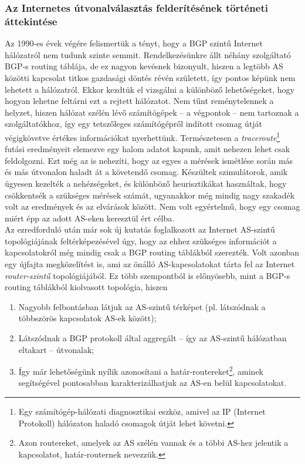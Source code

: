   \subsubsection{Az Internetes útvonalválasztás felderítésének történeti áttekintése}\label{section_tortenelem}
  Az 1990-es évek végére felismertük a tényt, hogy a BGP szintű Internet hálózatról nem tudunk szinte semmit. Rendelkezésünkre állt néhány szolgáltató BGP-s routing táblája, de ez nagyon kevésnek bizonyult, hiszen a legtöbb AS közötti kapcsolat titkos gazdasági döntés révén született, így pontos képünk nem lehetett a hálózatról. Ekkor kezdtük el vizsgálni a különböző lehetőségeket, hogy hogyan lehetne feltárni ezt a rejtett hálózatot. Nem tűnt reménytelennek a helyzet, hiszen hálózat szélén lévő számítógépek -- a végpontok -- nem tartoznak a szolgáltatókhoz, így egy tetszőleges számítógépről indított csomag útját végigkövetve értékes információkat nyerhettünk. Természetesen a \textit{traceroute}\footnote{Egy számítógép-hálózati diagnosztikai eszköz, amivel az IP (Internet Protokoll) hálózaton haladó csomagok útját lehet követni.} futási eredményeit elemezve egy halom adatot kapunk, amit nehezen lehet csak feldolgozni. Ezt még az is nehezíti, hogy az egyes a mérések ismétlése során más és más útvonalon haladt át a követendő csomag. Készültek szimulátorok, amik ügyesen kezelték a nehézségeket, és különböző heurisztikákat használtak, hogy csökkentsék a szükséges mérések számát\cite{Heuristics_for_Internet_Map_Discovery}, ugyanakkor még mindig nagy szakadék volt az eredmények és az elvárások között. Nem volt egyértelmű, hogy egy csomag miért épp az adott AS-eken keresztül ért célba.\\

  Az ezredforduló után már sok új kutatás foglalkozott az Internet AS-szintű topológiájának feltérképezésével úgy, hogy az ehhez szükséges információt a kapcsolatokról még mindig csak a BGP routing táblákból szerezték. Volt azonban egy újfajta megközelítést is, ami az önálló AS-kapcsolatokat tárta fel az Internet \textit{router-szintű} topológiájából\cite{Inferring_AS_level_Internet_Topology_from_Router_Level_Path_Traces}. Ez több szempontból is előnyösebb, mint a BGP-s routing táblákból kiolvasott topológia, hiszen
  \begin{enumerate}
    \item Nagyobb felbontásban látjuk az AS-szintű térképet (pl. látszódnak a többszörös kapcsolatok AS-ek között);
    \item Látszódnak a BGP protokoll által aggregált -- így az AS-szintű hálózatban eltakart -- útvonalak;
    \item Így már lehetőségünk nyílik azonosítani a határ-routereket\footnote{Azon routereket, amelyek az AS szélén vannak és a többi AS-hez jelentik a kapcsolatot, határ-routernek nevezzük.}, aminek segítségével pontosabban karakterizálhatjuk az AS-en belül kapcsolatokat.
  \end{enumerate}

